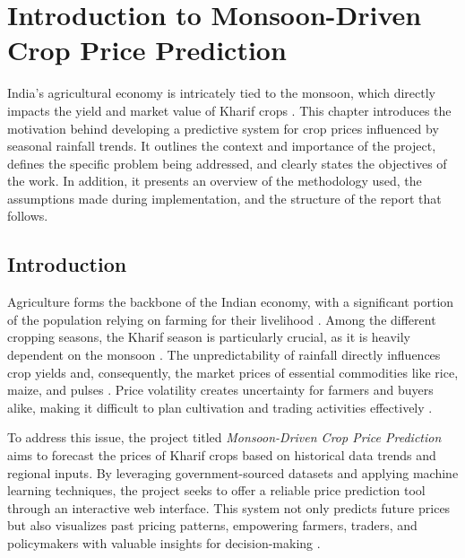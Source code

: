 \chapter{Introduction to Monsoon-Driven Crop Price Prediction}

India's agricultural economy is intricately tied to the monsoon, which directly impacts the yield and market value of Kharif crops \cite{gadgil2006monsoon, sarkar2019monsoon}. This chapter introduces the motivation behind developing a predictive system for crop prices influenced by seasonal rainfall trends. It outlines the context and importance of the project, defines the specific problem being addressed, and clearly states the objectives of the work. In addition, it presents an overview of the methodology used, the assumptions made during implementation, and the structure of the report that follows.

\section[Introduction]{\textbf{Introduction}}

Agriculture forms the backbone of the Indian economy, with a significant portion of the population relying on farming for their livelihood \cite{birthal2015}. Among the different cropping seasons, the Kharif season is particularly crucial, as it is heavily dependent on the monsoon \cite{gadgil2006monsoon}. The unpredictability of rainfall directly influences crop yields and, consequently, the market prices of essential commodities like rice, maize, and pulses \cite{ray2019climate}. Price volatility creates uncertainty for farmers and buyers alike, making it difficult to plan cultivation and trading activities effectively \cite{timmer2009price}.

To address this issue, the project titled \textit{Monsoon-Driven Crop Price Prediction} aims to forecast the prices of Kharif crops based on historical data trends and regional inputs. By leveraging government-sourced datasets and applying machine learning techniques, the project seeks to offer a reliable price prediction tool through an interactive web interface. This system not only predicts future prices but also visualizes past pricing patterns, empowering farmers, traders, and policymakers with valuable insights for decision-making \cite{jain2020deep, mahmud2025price}.

